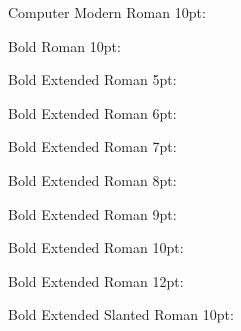 \documentclass[10pt,a4paper]{article}
\newcommand{\Ligature}{%

}
\begin{document}
Computer Modern Roman 10pt:\\{\Ligature}

Bold Roman 10pt:\\{\olb \Ligature}

Bold Extended Roman 5pt:\\{\olbxfive \Ligature}

Bold Extended Roman 6pt:\\{\olbxsix \Ligature}

Bold Extended Roman 7pt:\\{\olbxseven \Ligature}

Bold Extended Roman 8pt:\\{\olbxeight \Ligature}

Bold Extended Roman 9pt:\\{\olbxnine \Ligature}

Bold Extended Roman 10pt:\\{\olbxten \Ligature}

Bold Extended Roman 12pt:\\{\olbxtwelve \Ligature}

Bold Extended Slanted Roman 10pt:\\{\olbxs \Ligature}
\end{document}
